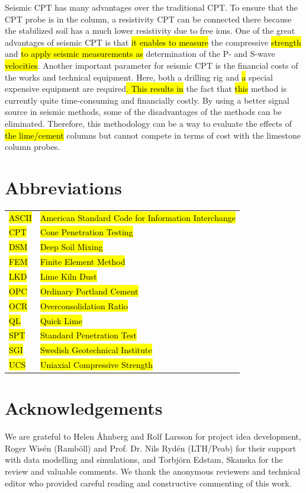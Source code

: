 \documentclass[final,3p,times,onecolumn,authoryear]{elsarticle}
\begin{document}
Seismic CPT has many advantages over the traditional CPT. To ensure that the CPT probe is in the column, a resistivity CPT can be connected there because the stabilized soil has a much lower resistivity due to free ions. One of the great advantages of seismic CPT is that \hl{it enables to measure }the compressive \hl{strength} and \hl{to apply seismic measurements as }determination of the P- and S-wave \hl{velocities}. Another important parameter for seismic CPT is the financial costs of the works and technical equipment. Here, both a drilling rig and \hl{a }special expensive equipment are required\hl{. This results in }the fact that \hl{this} method is currently quite time-consuming and financially costly. By using a better signal source in seismic methods, some of the disadvantages of the methods can be eliminated. Therefore, this methodology can be a way to evaluate the effects of \hl{the lime/cement} columns but cannot compete in terms of cost with the limestone column probes.

\section{Abbreviations}
\begin{tabular}{@{}ll}
\hl{ASCII} & \hl{American Standard Code for Information Interchange} \\
\hl{CPT} & \hl{Cone Penetration Testing} \\
\hl{DSM} & \hl{Deep Soil Mixing} \\
\hl{FEM} & \hl{Finite Element Method} \\
\hl{LKD} & \hl{Lime Kiln Dust} \\
\hl{OPC} & \hl{Ordinary Portland Cement} \\
\hl{OCR} & \hl{Overconsolidation Ratio} \\
\hl{QL} & \hl{Quick Lime} \\
\hl{SPT} & \hl{Standard Penetration Test} \\
\hl{SGI} & \hl{Swedish Geotechnical Institute} \\
\hl{UCS} & \hl{Uniaxial Compressive Strength}
\end{tabular}


\section{Acknowledgements}
We are grateful to Helen Åhnberg and Rolf Larsson for project idea development, Roger Wisén (Ramböll) and Prof. Dr. Nils Rydén (LTH/Peab) for their support with data modelling and simulations, and Torbjörn Edstam, Skanska for the review and valuable comments. We thank the anonymous reviewers and technical editor who provided careful reading and constructive commenting of this work. 
\end{document}
